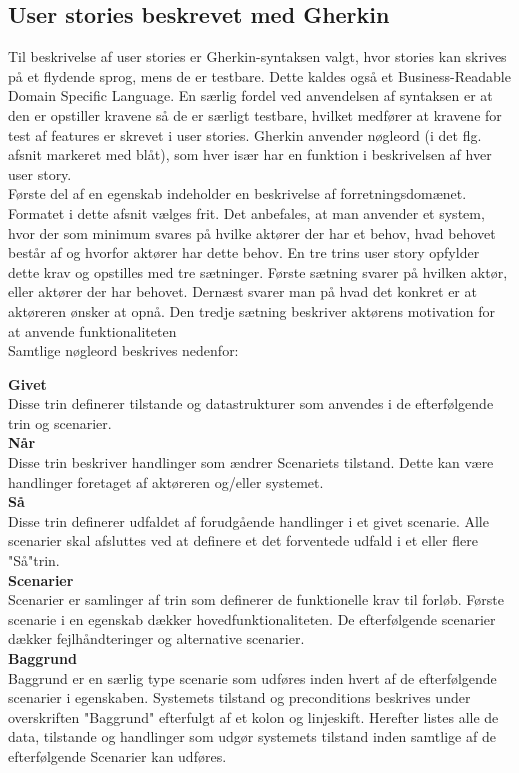 \subsection{User stories beskrevet med Gherkin}
Til beskrivelse af user stories er Gherkin-syntaksen valgt, hvor stories 
kan skrives på et flydende sprog, mens de er testbare.\cite{Gherkin} Dette kaldes også et Business-Readable Domain  
Specific Language. En særlig fordel ved anvendelsen af syntaksen er at den er opstiller kravene så de er særligt testbare, hvilket medfører at kravene for test af features er skrevet i user stories.
 Gherkin anvender nøgleord (i det flg. afsnit 
markeret med blåt), som hver især har en funktion i beskrivelsen af hver 
user story.  \vspace{0.2 cm}\\
Første del af en egenskab indeholder en beskrivelse af forretningsdomænet. 
Formatet i	dette afsnit vælges frit. Det anbefales, at man anvender et 
system, hvor der som minimum svares på hvilke aktører der har et behov, hvad 
behovet består af og hvorfor aktører har dette behov. En tre trins user 
story opfylder dette krav og opstilles med tre 
sætninger. Første sætning svarer på hvilken aktør, eller aktører der har
behovet. Dernæst svarer man på hvad det konkret er at aktøreren ønsker at 
opnå. Den tredje sætning beskriver aktørens motivation for at anvende 
funktionaliteten\\
Samtlige nøgleord beskrives nedenfor:

\large{\textbf{Givet}}\\
Disse trin definerer tilstande og datastrukturer som anvendes i de 
efterfølgende trin og scenarier.\\
\large{\textbf{Når}}\\
Disse trin beskriver handlinger som ændrer Scenariets tilstand. Dette kan 
være handlinger	foretaget af aktøreren og/eller systemet.\\
\large{\textbf{Så}}\\
Disse trin definerer udfaldet af forudgående handlinger i et givet 
scenarie. Alle scenarier skal afsluttes ved at definere et det forventede 
udfald i et eller flere "Så"trin.\\
\large{\textbf{Scenarier}}\\
Scenarier er samlinger af trin som definerer de funktionelle krav til 
forløb. Første scenarie i en egenskab dækker hovedfunktionaliteten. De 
efterfølgende scenarier dækker fejlhåndteringer og alternative scenarier.\\
\large{\textbf{Baggrund}}\\
Baggrund er en særlig type scenarie som udføres inden hvert af de 
efterfølgende scenarier	i egenskaben. Systemets tilstand og preconditions 
beskrives under overskriften "Baggrund" efterfulgt af et kolon og 
linjeskift. Herefter listes alle de data, tilstande og handlinger som udgør 
systemets tilstand inden samtlige af de efterfølgende Scenarier kan	udføres.


